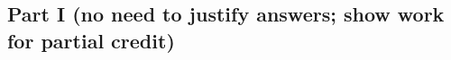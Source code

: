 \documentclass[12pt,letterpaper]{article}
\begin{document}





\subsection*{Part I (no need to justify answers; show work for partial credit)} 
\end{document}
